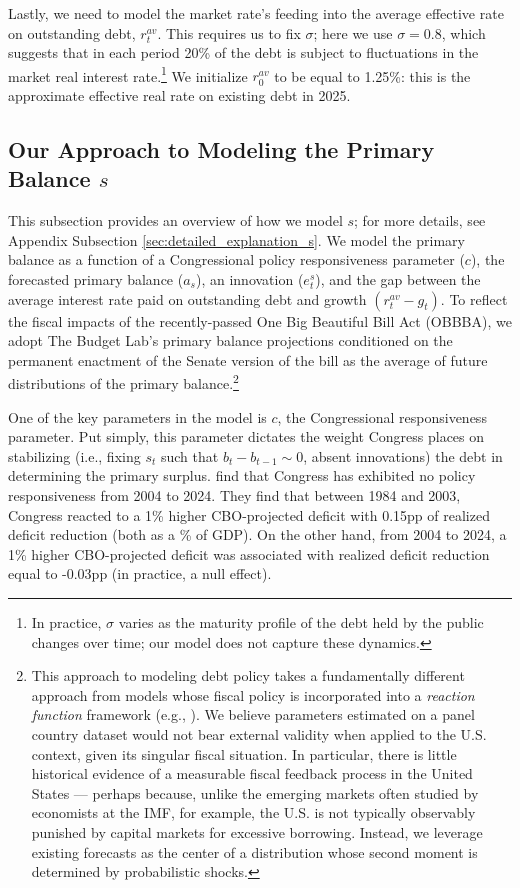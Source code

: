 \documentclass[12pt]{article}
\begin{document}
Lastly, we need to model the market rate's feeding into the average effective rate on outstanding debt, $r^{av}_t$. This requires us to fix $\sigma$; here we use $\sigma = 0.8$, which suggests that in each period 20\% of the debt is subject to fluctuations in the market real interest rate.\footnote{In practice, $\sigma$ varies as the maturity profile of the debt held by the public changes over time; our model does not capture these dynamics.} We initialize $r^{av}_0$ to be equal to 1.25\%: this is the approximate effective real rate on existing debt in 2025.

\subsection{Our Approach to Modeling the Primary Balance $s$}

This subsection provides an overview of how we model $s$; for more details, see Appendix Subsection \ref{sec:detailed_explanation_s}. We model the primary balance as a function of a Congressional policy responsiveness parameter ($c$), the forecasted primary balance ($a_s$), an innovation ($e^s_t$), and the gap between the average interest rate paid on outstanding debt and growth $(r^{av}_t - g_t)$. To reflect the fiscal impacts of the recently-passed One Big Beautiful Bill Act (OBBBA), we adopt The Budget Lab's primary balance projections conditioned on the permanent enactment of the Senate version of the bill as the average of future distributions of the primary balance.\footnote{This approach to modeling debt policy takes a fundamentally different approach from models whose fiscal policy is incorporated into a \textit{reaction function} framework (e.g., \textcite{celasun_2006}). We believe parameters estimated on a panel country dataset would not bear external validity when applied to the U.S. context, given its singular fiscal situation. In particular, there is little historical evidence of a measurable fiscal feedback process in the United States --- perhaps because, unlike the emerging markets often studied by economists at the IMF, for example, the U.S. is not typically observably punished by capital markets for excessive borrowing. Instead, we leverage existing forecasts as the center of a distribution whose second moment is determined by probabilistic shocks.}

One of the key parameters in the model is $c$, the Congressional responsiveness parameter. Put simply, this parameter dictates the weight Congress places on stabilizing (i.e., fixing $s_t$ such that $b_{t} - b_{t-1} \sim 0$, absent innovations) the debt in determining the primary surplus. \textcite{auerbach2025robust} find that Congress has exhibited no policy responsiveness from 2004 to 2024. They find that between 1984 and 2003, Congress reacted to a 1\% higher CBO-projected deficit with 0.15pp of realized deficit reduction (both as a \% of GDP). On the other hand, from 2004 to 2024, a 1\% higher CBO-projected deficit was associated with realized deficit reduction equal to -0.03pp (in practice, a null effect).
\end{document}
